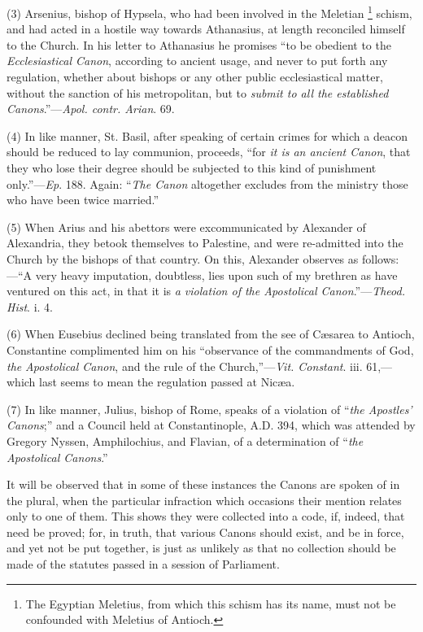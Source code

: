 (3) Arsenius, bishop of Hypsela, who had been involved in the
Meletian \footnote{The Egyptian
Meletius, from which this schism has its name, must not be confounded
with Meletius of Antioch.} schism, and had
acted in a hostile way towards Athanasius, at length reconciled
himself to the Church. In his letter to Athanasius he promises
``to be obedient to the \emph{Ecclesiastical Canon},
according to ancient usage, and never to put forth any regulation,
whether about bishops or any other public ecclesiastical matter,
without the sanction of his metropolitan, but to \emph{submit to all the
established Canons}.''—\emph{Apol. contr. Arian}. 69.

(4) In like manner, St. Basil, after speaking of certain crimes for
which a deacon should be reduced to lay communion, proceeds, ``for
\emph{it is an ancient Canon}, that they who lose their degree should
be subjected to this kind of punishment only.''—\emph{Ep}. 188.
Again: ``\emph{The Canon} altogether excludes from the ministry
those who have been twice married.''

(5) When Arius and his abettors were excommunicated by Alexander of
Alexandria, they betook themselves to Palestine, and were re-admitted
into the Church by the bishops of that country. On this, Alexander
observes as follows:—``A very heavy imputation, doubtless, lies
upon such of my brethren as have ventured on this act, in that it is \emph{a
violation of the Apostolical Canon}.''—\emph{Theod. Hist}. i.
4.

(6) When Eusebius declined being translated from the see of
Cæsarea to Antioch, Constantine complimented him on his
``observance of the commandments of God, \emph{the} \emph{Apostolical
Canon}, and the rule of the Church,''—\emph{Vit. Constant}.
iii. 61,—which last seems to mean the regulation passed at Nicæa.

(7) In like manner, Julius, bishop of Rome, speaks of a violation
of ``\emph{the Apostles' Canons};'' and a Council held at
Constantinople, A.D. 394, which was attended by
Gregory Nyssen, Amphilochius, and Flavian, of a determination of
``\emph{the Apostolical Canons}.''

It will be observed that in some of these instances the Canons are
spoken of in the plural, when the particular infraction which
occasions their mention relates only to one of them. This shows
they were collected into a code, if, indeed, that need be proved; for,
in truth, that various Canons should exist, and be in force, and yet
not be put together, is just as unlikely as that no collection should
be made of the statutes passed in a session of Parliament.

